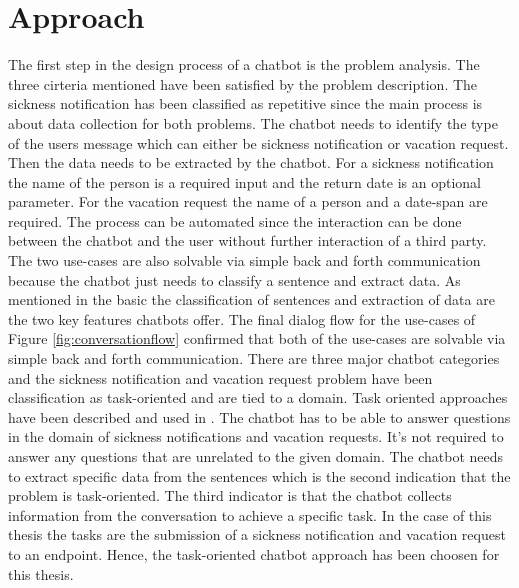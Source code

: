 
\section{Approach}

The first step in the design process of a chatbot is the problem analysis.
The three cirteria \citet{singhbuilding} mentioned have been satisfied by 
the problem description.
The sickness notification has been classified as repetitive since the main 
process is about data collection for both problems.
The chatbot needs to identify the type of the users message which can either be 
sickness notification or vacation request.
Then the data needs to be extracted by the chatbot.
For a sickness notification the name of the person is a required input and 
the return date is an optional parameter.
For the vacation request the name of a person and a date-span are required. 
The process can be automated since the interaction can be done between 
the chatbot and the user without further interaction of a third party.
The two use-cases are also solvable via simple back and forth communication 
because the chatbot just needs to classify a sentence and 
extract data. 
As mentioned in the basic the classification of sentences and extraction 
of data are the two key features chatbots offer.
The final dialog flow for the use-cases of Figure \ref{fig:conversationflow}
confirmed that both of the use-cases are solvable via simple back and forth 
communication.
There are three major chatbot categories and the sickness notification and 
vacation request problem have been classification as task-oriented and are 
tied to a domain.
Task oriented approaches have been described and used in 
\citet{deshpande2017survey, luis2015williams, braunEvaluatingNLU, williams2017hybrid}.
The chatbot has to be able to answer questions in the domain of sickness notifications 
and vacation requests.
It's not required to answer any questions that are unrelated to the given domain.
The chatbot needs to extract specific data from the sentences which is the second 
indication that the problem is task-oriented.
The third indicator is that the chatbot collects information from the 
conversation to achieve a specific task.
In the case of this thesis the tasks are the submission of a sickness notification
and vacation request to an endpoint. 
Hence, the task-oriented chatbot approach has been choosen for this thesis.
